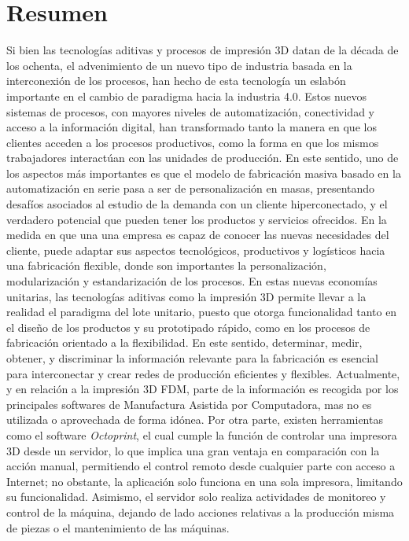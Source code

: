 \section{Resumen}
\label{intro:resumen}
Si bien las tecnologías aditivas y procesos de impresión 3D datan de la década de los ochenta, el advenimiento de un nuevo tipo de industria basada en la interconexión de los procesos, han hecho de esta tecnología un eslabón importante en el cambio de paradigma hacia la industria 4.0. Estos nuevos sistemas de procesos, con mayores niveles de automatización, conectividad y acceso a la información digital, han transformado tanto la manera en que los clientes acceden a los procesos productivos, como la forma en que los mismos trabajadores interactúan con las unidades de producción. En este sentido, uno de los aspectos más importantes es que el modelo de fabricación masiva basado en la automatización en serie pasa a ser de personalización en masas, presentando desafíos asociados al estudio de la demanda con un cliente hiperconectado, y el verdadero potencial que pueden tener los productos y servicios ofrecidos. En la medida en que una una empresa es capaz de conocer las nuevas necesidades del cliente, puede adaptar sus aspectos tecnológicos, productivos y logísticos hacia una fabricación flexible, donde son importantes la personalización, modularización y estandarización de los procesos. En estas nuevas economías unitarias, las tecnologías aditivas como la impresión 3D permite llevar a la realidad el paradigma del lote unitario, puesto que otorga funcionalidad tanto en el diseño de los productos y su prototipado rápido, como en los procesos de fabricación orientado a la flexibilidad.  En este sentido, determinar, medir, obtener, y discriminar la información relevante para la fabricación es esencial para interconectar y crear redes de producción eficientes y flexibles. Actualmente, y en relación a la impresión 3D FDM, parte de la información es recogida por los principales softwares de Manufactura Asistida por Computadora, mas no es utilizada o aprovechada de forma idónea. Por otra parte, existen herramientas como el software \textit{Octoprint}, el cual cumple la función de controlar una impresora 3D desde un servidor, lo que implica una gran ventaja en comparación con la acción manual, permitiendo el control remoto desde cualquier parte con acceso a Internet; no obstante, la aplicación solo funciona en una sola impresora, limitando su funcionalidad. Asimismo, el servidor solo realiza actividades de monitoreo y control de la máquina, dejando de lado acciones relativas a la producción misma de piezas o el mantenimiento de las máquinas.       
